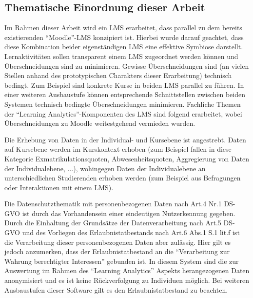 


\subsection{Thematische Einordnung dieser Arbeit}


Im Rahmen dieser Arbeit wird ein \ac{LMS} erarbeitet, dass parallel zu dem bereits existierenden \enquote{Moodle}-\ac{LMS} konzipiert ist. Hierbei wurde darauf geachtet, dass diese Kombination beider eigenständigen \ac{LMS} eine effektive Symbiose darstellt. Lernaktivitäten sollen transparent einem \ac{LMS} zugeordnet werden können und Überschneidungen sind zu minimieren. Gewisse Überschneidungen sind (an vielen Stellen anhand des prototypischen Charakters dieser Erarbeitung) technisch bedingt. Zum Beispiel sind konkrete Kurse in beiden \ac{LMS} parallel zu führen. In einer weiteren Ausbaustufe können entsprechende Schnittstellen zwischen beiden Systemen technisch bedingte Überschneidungen minimieren. Fachliche Themen der \enquote{Learning Analytics}-Komponenten des \ac{LMS} sind folgend erarbeitet, wobei Überschneidungen zu Moodle weitestgehend vermieden wurden. 

Die Erhebung von Daten in der Individual- und Kursebene ist angestrebt. Daten auf Kursebene werden im Kurskontext erhoben (zum Beispiel fallen in diese Kategorie Exmatrikulationsquoten, Abwesenheitsquoten, Aggregierung von Daten der Individualebene, $\ldots$), wohingegen Daten der Individualebene an unterschiedlichen Studierenden erhoben werden (zum Beispiel aus Befragungen oder Interaktionen mit einem \ac{LMS}).

Die Datenschutzthematik mit personenbezogenen Daten nach Art.4 Nr.1 DS-GVO ist durch das Vorhandensein einer eindeutigen Nutzerkennung gegeben. Durch die Einhaltung der Grundsätze der Datenverarbeitung nach Art.5 DS-GVO und des Vorliegen des Erlaubnistatbestands nach Art.6 Abs.1 S.1 lit.f ist die Verarbeitung dieser personenbezogenen Daten aber  zulässig. Hier gilt es jedoch anzumerken, dass der Erlaubnistatbestand an die \enquote{Verarbeitung zur Wahrung berechtigter Interessen} gebunden ist. In diesem System sind die zur Auswertung im Rahmen des \enquote{Learning Analytics} Aspekts herangezogenen Daten anonymisiert und es ist keine Rückverfolgung zu Individuen möglich. Bei weiteren Ausbaustufen dieser Software gilt es den Erlaubnistatbestand zu beachten. 

